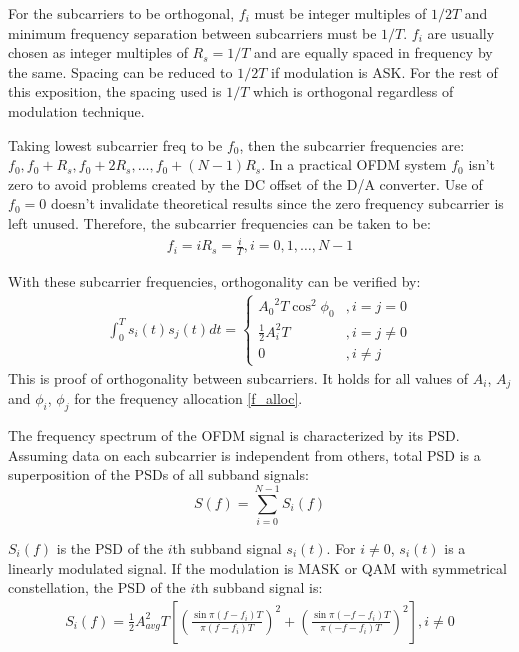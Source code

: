 For the \gls{subcarrier}s to be \gls{orthogonal}, $f_i$ must be integer multiples of $1/2T$ and minimum frequency separation between \gls{subcarrier}s must be $1/T$. $f_i$ are usually chosen as integer multiples of $R_s = 1/T$ and are equally spaced in frequency by the same. Spacing can be reduced to $1/2T$ if modulation is \gls{ASK}\cite{fuqin}. For the rest of this exposition, the spacing used is $1/T$ which is \gls{orthogonal} regardless of modulation technique.

Taking lowest \gls{subcarrier} freq to be $f_0$, then the \gls{subcarrier} frequencies are: $f_0, f_0+R_s, f_0+2R_s,\ldots , f_0 + (N-1)R_s$. In a practical \gls{OFDM} system $f_0$ isn't zero to avoid problems created by the DC offset of the \gls{D/A} converter. Use of $f_0 = 0$ doesn't invalidate theoretical results since the zero frequency \gls{subcarrier} is left unused\cite{fuqin}. Therefore, the \gls{subcarrier} frequencies can be taken to be:
\begin{align}
	\label{f_alloc}
	f_i = iR_s = \frac{i}{T}, i = 0,1,\ldots , N-1
\end{align}

With these \gls{subcarrier} frequencies, \gls{orthogonal}ity can be verified by:\\
\begin{align*}	%
	\int_0^Ts_i(t)s_j(t)dt = \begin{cases}
	{A_0}^2T\cos^2\phi_0 &, i=j=0\\
	\frac{1}{2}A_i^2T &, i=j\neq 0\\
	0 &, i\neq j
	\end{cases}
\end{align*}
This is proof of \gls{orthogonal}ity between \gls{subcarrier}s\cite{ofdm_intro}. It holds for all values of $A_i$, $A_j$ and $\phi_i$, $\phi_j$ for the frequency allocation \eqref{f_alloc}.

The frequency spectrum of the OFDM signal is characterized by its \gls{PSD}. Assuming data on each \gls{subcarrier} is independent from others, total \gls{PSD} is a superposition of the \gls{PSD}s of all \gls{subband} signals\cite{fuqin}:
$$S(f) = \sum_{i=0}^{N-1}S_i(f)$$

$S_i(f)$ is the \gls{PSD} of the $i$th \gls{subband} signal $s_i(t)$. For $i\neq 0$, $s_i(t)$ is a linearly modulated signal. If the modulation is \gls{MASK} or \gls{QAM} with symmetrical constellation, the \gls{PSD} of the $i$th \gls{subband} signal is:
\begin{align}
\label{psd_cont}
S_i(f) = \frac{1}{2}A_{avg}^2T\left[ \left(\frac{\sin \pi (f-f_i)T}{\pi (f-f_i)T}\right)^2 + \left(\frac{\sin \pi (-f-f_i)T}{\pi (-f-f_i)T}\right)^2\right], i\neq 0
\end{align}

